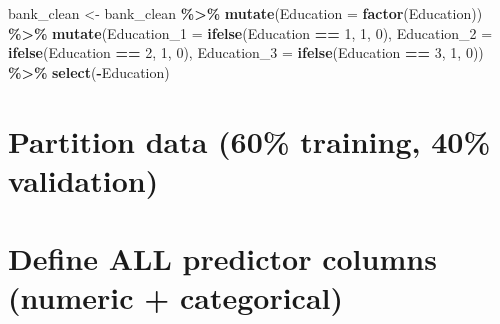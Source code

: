 \documentclass[
]{article}
\newenvironment{Shaded}{\begin{snugshade}}{\end{snugshade}}
\newcommand{\AttributeTok}[1]{\textcolor[rgb]{0.13,0.29,0.53}{#1}}
\newcommand{\ConstantTok}[1]{\textcolor[rgb]{0.56,0.35,0.01}{#1}}
\newcommand{\DecValTok}[1]{\textcolor[rgb]{0.00,0.00,0.81}{#1}}
\newcommand{\FloatTok}[1]{\textcolor[rgb]{0.00,0.00,0.81}{#1}}
\newcommand{\FunctionTok}[1]{\textcolor[rgb]{0.13,0.29,0.53}{\textbf{#1}}}
\newcommand{\NormalTok}[1]{#1}
\newcommand{\OtherTok}[1]{\textcolor[rgb]{0.56,0.35,0.01}{#1}}
\newcommand{\SpecialCharTok}[1]{\textcolor[rgb]{0.81,0.36,0.00}{\textbf{#1}}}
\begin{document}
\begin{Shaded}
\begin{Highlighting}[]
\NormalTok{bank\_clean }\OtherTok{\textless{}{-}}\NormalTok{ bank\_clean }\SpecialCharTok{\%\textgreater{}\%} 
  \FunctionTok{mutate}\NormalTok{(}\AttributeTok{Education =} \FunctionTok{factor}\NormalTok{(Education)) }\SpecialCharTok{\%\textgreater{}\%}
  \FunctionTok{mutate}\NormalTok{(}\AttributeTok{Education\_1 =} \FunctionTok{ifelse}\NormalTok{(Education }\SpecialCharTok{==} \DecValTok{1}\NormalTok{, }\DecValTok{1}\NormalTok{, }\DecValTok{0}\NormalTok{),}
         \AttributeTok{Education\_2 =} \FunctionTok{ifelse}\NormalTok{(Education }\SpecialCharTok{==} \DecValTok{2}\NormalTok{, }\DecValTok{1}\NormalTok{, }\DecValTok{0}\NormalTok{),}
         \AttributeTok{Education\_3 =} \FunctionTok{ifelse}\NormalTok{(Education }\SpecialCharTok{==} \DecValTok{3}\NormalTok{, }\DecValTok{1}\NormalTok{, }\DecValTok{0}\NormalTok{)) }\SpecialCharTok{\%\textgreater{}\%}
  \FunctionTok{select}\NormalTok{(}\SpecialCharTok{{-}}\NormalTok{Education)}
\end{Highlighting}
\end{Shaded}

\section{Partition data (60\% training, 40\%
validation)}\label{partition-data-60-training-40-validation}

\begin{Shaded}
\end{Shaded}

\section{Define ALL predictor columns (numeric +
categorical)}\label{define-all-predictor-columns-numeric-categorical}
\end{document}
